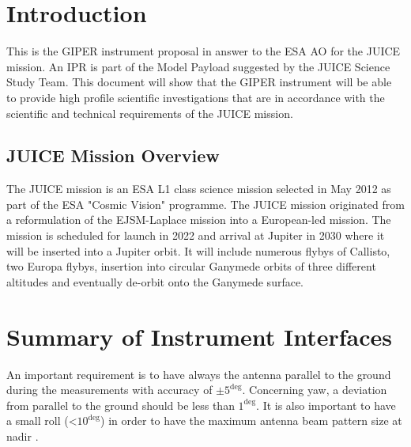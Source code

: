 \section{Introduction}
\label{sec:introduction}
%
This is the \ac{GIPER} instrument proposal in answer to the \ac{ESA} \ac{AO}\cite{JUICE_AO} for the \ac{JUICE} mission. An \ac{IPR} is part of the Model Payload suggested by the  JUICE Science Study Team\cite{yellowbook}. This document will show that the \ac{GIPER} instrument will be able to provide high profile scientific investigations that are in accordance with the scientific and technical requirements of the \ac{JUICE} mission.
%
\subsection{JUICE Mission Overview}
The \ac{JUICE} mission is an \ac{ESA} L1 class science mission selected in May 2012 as part of the \ac{ESA} "Cosmic Vision" programme. The \ac{JUICE} mission originated from a reformulation of the EJSM-Laplace mission into a European-led mission. The mission is scheduled for launch in 2022 and arrival at Jupiter in 2030 where it will be inserted into a Jupiter orbit. It will include numerous flybys of Callisto, two Europa flybys, insertion into circular Ganymede orbits of three different altitudes and eventually de-orbit onto the Ganymede surface. 
%
%
%

%
%

%
%
\section{Summary of Instrument Interfaces}
An important requirement is to have always the antenna parallel to the ground during the measurements with accuracy of $\pm 5^{\deg}$. Concerning yaw, a deviation from parallel to the ground should be less than $1^{\deg}$. It is also important to have a small roll (<$ 10^{\deg}$) in order to have the maximum antenna beam pattern size at nadir \cite{yellowbook}.
%
